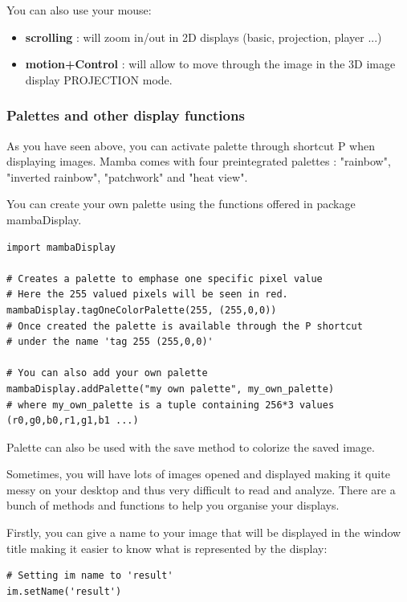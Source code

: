 \documentclass[a4paper,10pt,oneside]{article}
\begin{document}
You can also use your mouse:

\begin{itemize}
\item \textbf{scrolling} : will zoom in/out in 2D displays (basic, 
projection, player ...)
\item \textbf{motion+Control} : will allow to move through the image
in the 3D image display PROJECTION mode.
\end{itemize}

\subsubsection{Palettes and other display functions}
\label{cha:pal}

As you have seen above, you can activate palette through shortcut P when displaying
images. Mamba comes with four preintegrated palettes : "rainbow", "inverted rainbow",
"patchwork" and "heat view".

You can create your own palette using the functions offered in package
mambaDisplay.

\lstset{language=Python}
\begin{lstlisting}
import mambaDisplay

# Creates a palette to emphase one specific pixel value
# Here the 255 valued pixels will be seen in red.
mambaDisplay.tagOneColorPalette(255, (255,0,0))
# Once created the palette is available through the P shortcut
# under the name 'tag 255 (255,0,0)'

# You can also add your own palette
mambaDisplay.addPalette("my own palette", my_own_palette)
# where my_own_palette is a tuple containing 256*3 values (r0,g0,b0,r1,g1,b1 ...)
\end{lstlisting}

Palette can also be used with the save method to colorize the saved image.

Sometimes, you will have lots of images opened and displayed making it quite
messy on your desktop and thus very difficult to read and analyze. There are a
bunch of methods and functions to help you organise your displays.

Firstly, you can give a name to your image that will be displayed in the window
title making it easier to know what is represented by the display:

\lstset{language=Python}
\begin{lstlisting}
# Setting im name to 'result'
im.setName('result')
\end{lstlisting}
\end{document}
